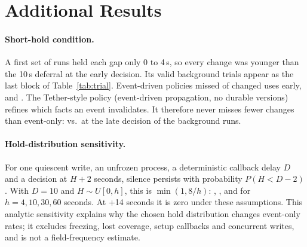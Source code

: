 













\section{Additional Results}
\label{app:extra}

\paragraph{Short-hold condition.} A first set of runs held each gap only 0 to 4\,s, so every change was younger than the 10\,s deferral at the early decision. Its \ETwoRone valid background trials appear as the last block of Table~\ref{tab:trial}. Event-driven policies missed \RoneEarlyEvK of \RoneEarlyChanged changed uses early, and \stamp \RoneEarlyLmK. The Tether-style policy (event-driven propagation, no durable versions) refines which facts an event invalidates. It therefore never misses fewer changes than event-only: \AllTeK vs.\ \AllEvK at the late decision of the background runs.

\paragraph{Hold-distribution sensitivity.} For one quiescent write, an unfrozen process, a deterministic callback delay $D$ and a decision at $H+2$ seconds, silence persists with probability $P(H<D-2)$. With $D=10$ and $H\sim U[0,h]$, this is $\min(1,8/h)$: \HoldSensFour, \HoldSensTen, \HoldSensThirty and \HoldSensSixty for $h=4,10,30,60$ seconds. At +14 seconds it is zero under these assumptions. This analytic sensitivity explains why the chosen hold distribution changes event-only rates; it excludes freezing, lost coverage, setup callbacks and concurrent writes, and is not a field-frequency estimate.

